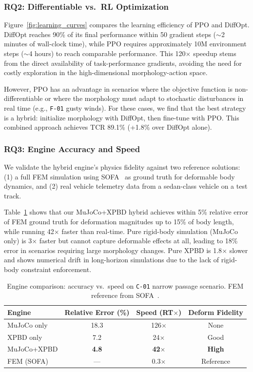 \subsubsection{RQ2: Differentiable vs.\ RL Optimization}

Figure~\ref{fig:learning_curves} compares the learning efficiency of PPO and DiffOpt. DiffOpt reaches 90\% of its final performance within 50 gradient steps ($\sim$2 minutes of wall-clock time), while PPO requires approximately 10M environment steps ($\sim$4 hours) to reach comparable performance. This 120$\times$ speedup stems from the direct availability of task-performance gradients, avoiding the need for costly exploration in the high-dimensional morphology-action space.

However, PPO has an advantage in scenarios where the objective function is non-differentiable or where the morphology must adapt to stochastic disturbances in real time (e.g., \texttt{F-01} gusty winds). For these cases, we find that the best strategy is a hybrid: initialize morphology with DiffOpt, then fine-tune with PPO. This combined approach achieves TCR 89.1\% (+1.8\% over DiffOpt alone).

\subsubsection{RQ3: Engine Accuracy and Speed}

We validate the hybrid engine's physics fidelity against two reference solutions: (1) a full FEM simulation using SOFA~\cite{faure2012sofa} as ground truth for deformable body dynamics, and (2) real vehicle telemetry data from a sedan-class vehicle on a test track.

Table~\ref{tab:engine_accuracy} shows that our MuJoCo+XPBD hybrid achieves within 5\% relative error of FEM ground truth for deformation magnitudes up to 15\% of body length, while running 42$\times$ faster than real-time. Pure rigid-body simulation (MuJoCo only) is 3$\times$ faster but cannot capture deformable effects at all, leading to 18\% error in scenarios requiring large morphology changes. Pure XPBD is 1.8$\times$ slower and shows numerical drift in long-horizon simulations due to the lack of rigid-body constraint enforcement.

\begin{table}[t]
\centering
\caption{Engine comparison: accuracy vs.\ speed on \texttt{C-01} narrow passage scenario. FEM reference from SOFA~\cite{faure2012sofa}.}
\label{tab:engine_accuracy}
\begin{tabular}{lccc}
\toprule
Engine & Relative Error (\%) & Speed (RT$\times$) & Deform Fidelity \\
\midrule
MuJoCo only     & 18.3 & 126$\times$ & None \\
XPBD only       & 7.2  & 24$\times$  & Good \\
MuJoCo+XPBD     & \textbf{4.8}  & \textbf{42$\times$} & \textbf{High} \\
FEM (SOFA)      & ---  & 0.3$\times$  & Reference \\
\bottomrule
\end{tabular}
\end{table}

